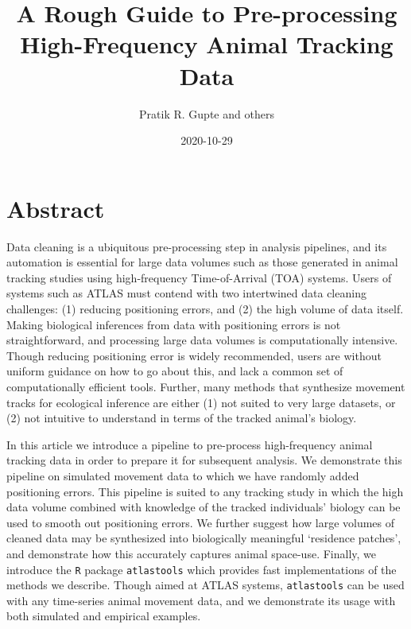 \documentclass[
]{scrreprt}
\title{A Rough Guide to Pre-processing High-Frequency Animal Tracking Data}
\author{Pratik R. Gupte and others}
\date{2020-10-29}
\begin{document}
\maketitle

{
\setcounter{tocdepth}{1}
\tableofcontents
}
\hypertarget{abstract}{%
\chapter{Abstract}\label{abstract}}

Data cleaning is a ubiquitous pre-processing step in analysis pipelines, and its automation is essential for large data volumes such as those generated in animal tracking studies using high-frequency Time-of-Arrival (TOA) systems.
Users of systems such as ATLAS must contend with two intertwined data cleaning challenges: (1) reducing positioning errors, and (2) the high volume of data itself.
Making biological inferences from data with positioning errors is not straightforward, and processing large data volumes is computationally intensive.
Though reducing positioning error is widely recommended, users are without uniform guidance on how to go about this, and lack a common set of computationally efficient tools.
Further, many methods that synthesize movement tracks for ecological inference are either (1) not suited to very large datasets, or (2) not intuitive to understand in terms of the tracked animal's biology.

In this article we introduce a pipeline to pre-process high-frequency animal tracking data in order to prepare it for subsequent analysis.
We demonstrate this pipeline on simulated movement data to which we have randomly added positioning errors.
This pipeline is suited to any tracking study in which the high data volume combined with knowledge of the tracked individuals' biology can be used to smooth out positioning errors.
We further suggest how large volumes of cleaned data may be synthesized into biologically meaningful `residence patches', and demonstrate how this accurately captures animal space-use.
Finally, we introduce the \texttt{R} package \texttt{atlastools} which provides fast implementations of the methods we describe.
Though aimed at ATLAS systems, \texttt{atlastools} can be used with any time-series animal movement data, and we demonstrate its usage with both simulated and empirical examples.
\end{document}
